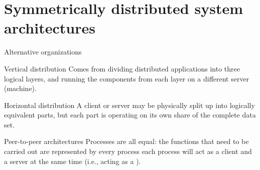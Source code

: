 \section{Symmetrically distributed system architectures}
\begin{slide}{Alternative organizations}
  \begin{block}{Vertical distribution}
    Comes from dividing distributed applications into three logical layers, and running the components
    from each layer on a different server (machine).
  \end{block}
  \begin{block}{Horizontal distribution}
    A client or server may be physically split up into logically equivalent parts, but each part is operating
    on its own share of the complete data set.
  \end{block}
  \begin{block}{Peer-to-peer architectures}
    Processes are all equal: the functions that need to be carried out are represented by every process
    \mathexpr{\Rightarrow} each process will act as a client and a server at the same time (i.e.,
    acting as a ).
  \end{block}
\end{slide}
